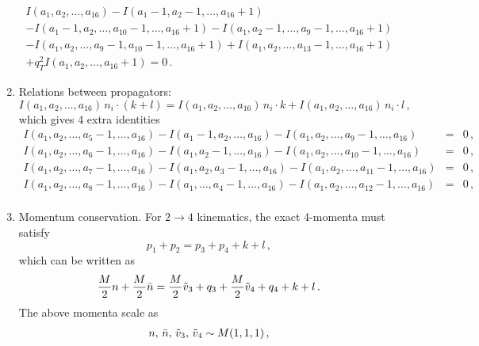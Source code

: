\documentclass[a4paper,11pt]{report}
\numberwithin{equation}{section}
\begin{document}
\begin{enumerate}
\begin{eqnarray}
     I(a_1,a_2,\ldots, a_{16}) 
     - I(a_1-1,a_2-1,\ldots,  a_{16}+1)
     \nonumber \\
     - I(a_1-1,a_2,\ldots, a_{10}-1, \ldots, a_{16}+1)
     - I(a_1,a_2-1,\ldots, a_9-1, \ldots, a_{16}+1)
     \nonumber \\
     - I(a_1,a_2,\ldots, a_9-1, a_{10}-1, \ldots, a_{16}+1)
     + I(a_1,a_2,\ldots, a_{13}-1, \ldots, a_{16}+1)
     \nonumber \\
     + q_T^2 I(a_1,a_2, \ldots, a_{16}+1) = 0\,.
  \end{eqnarray}
  \item
  Relations between propagators:
  \begin{equation}
    I(a_1,a_2,\ldots, a_{16})\, n_i \cdot (k+l) = 
    I(a_1,a_2,\ldots, a_{16})\, n_i \cdot k +
    I(a_1,a_2,\ldots, a_{16})\, n_i \cdot l\,,
  \end{equation}
  which gives 4 extra identities
  \begin{eqnarray}
    I(a_1,a_2,\ldots, a_5-1, \ldots, a_{16}) - 
    I(a_1-1,a_2,\ldots, a_{16}) -
    I(a_1,a_2,\ldots, a_9-1, \ldots, a_{16}) & = & 0\,,
    \nonumber \\
    I(a_1,a_2,\ldots, a_6-1, \ldots, a_{16}) - 
    I(a_1,a_2-1,\ldots, a_{16}) -
    I(a_1,a_2,\ldots, a_{10}-1, \ldots, a_{16}) & = & 0\,,
    \nonumber \\
    I(a_1,a_2,\ldots, a_7-1, \ldots, a_{16}) - 
    I(a_1,a_2,a_3-1, \ldots, a_{16}) -
    I(a_1,a_2,\ldots, a_{11}-1, \ldots, a_{16}) & = & 0\,,
    \nonumber \\
    I(a_1,a_2,\ldots, a_8-1, \ldots, a_{16}) - 
    I(a_1,\ldots,a_4-1,\ldots, a_{16}) -
    I(a_1,a_2,\ldots, a_{12}-1, \ldots, a_{16}) & = & 0\,,
    \nonumber \\
  \end{eqnarray}
  \item
  Momentum conservation. For $2 \to 4$ kinematics, the exact 4-momenta must satisfy
  \begin{equation}
    p_1 + p_2 = p_3 + p_4 + k + l\,,
  \end{equation}
  which can be written as
  \begin{equation}
   \frac{M}{2} n + \frac{M}{2} \bar{n}  = 
   \frac{M}{2} \tilde v_3 + q_3 + \frac{M}{2} \tilde v_4 + q_4 + k + l\,.
  \end{equation}
  The above momenta scale as
  \begin{eqnarray}
    n,\, \nbar,\, \tilde v_3,\, \tilde v_4 \sim M (1,1,1)\,, \\

\end{eqnarray}
\end{enumerate}
\end{document}
